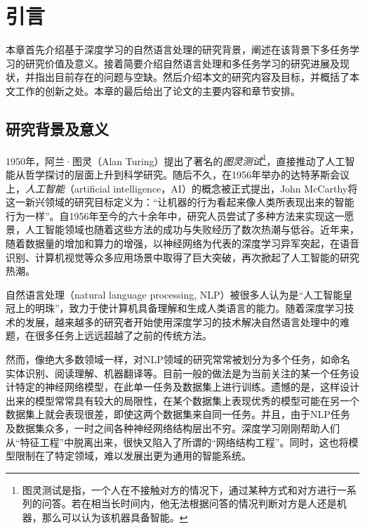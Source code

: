 \chapter{引言}
\label{cha:intro}
本章首先介绍基于深度学习的自然语言处理的研究背景，阐述在该背景下多任务学习的研究价值及意义。接着简要介绍自然语言处理和多任务学习的研究进展及现状，并指出目前存在的问题与空缺。然后介绍本文的研究内容及目标，并概括了本文工作的创新之处。本章的最后给出了论文的主要内容和章节安排。

\section{研究背景及意义}
1950年，阿兰·图灵（Alan Turing）提出了著名的\emph{图灵测试}\footnote{图灵测试是指，一个人在不接触对方的情况下，通过某种方式和对方进行一系列的问答。若在相当长时间内，他无法根据问答的情况判断对方是人还是机器，那么可以认为该机器具备智能。}，直接推动了人工智能从哲学探讨的层面上升到科学研究。随后不久，在1956年举办的达特茅斯会议上，\emph{人工智能}（artificial intelligence，AI）的概念被正式提出，John McCarthy将这一新兴领域的研究目标定义为：“让机器的行为看起来像人类所表现出来的智能行为一样”。自1956年至今的六十余年中，研究人员尝试了多种方法来实现这一愿景，人工智能领域也随着这些方法的成功与失败经历了数次热潮与低谷。近年来，随着数据量的增加和算力的增强，以神经网络为代表的深度学习异军突起，在语音识别\cite{DBLP:conf/asru/MikolovDPBC11}\cite{DBLP:conf/apsipa/LiHYW13}、计算机视觉\cite{DBLP:journals/cacm/KrizhevskySH17}\cite{DBLP:journals/pami/FarabetCNL13}\cite{DBLP:conf/nips/TompsonJLB14}等众多应用场景中取得了巨大突破，再次掀起了人工智能的研究热潮。

自然语言处理（natural language processing, NLP）被很多人认为是“人工智能皇冠上的明珠”，致力于使计算机具备理解和生成人类语言的能力。随着深度学习技术的发展，越来越多的研究者开始使用深度学习的技术解决自然语言处理中的难题\cite{DBLP:journals/jmlr/CollobertWBKKK11}\cite{DBLP:conf/emnlp/BordesCW14}\cite{DBLP:conf/acl/JeanCMB15}\cite{DBLP:conf/nips/SutskeverVL14}，在很多任务上远远超越了之前的传统方法。

然而，像绝大多数领域一样，对NLP领域的研究常常被划分为多个任务，如命名实体识别、阅读理解、机器翻译等。目前一般的做法是为当前关注的某一个任务设计特定的神经网络模型，在此单一任务及数据集上进行训练。遗憾的是，这样设计出来的模型常常具有较大的局限性，在某个数据集上表现优秀的模型可能在另一个数据集上就会表现很差，即使这两个数据集来自同一任务。并且，由于NLP任务及数据集众多，一时之间各种神经网络结构层出不穷。深度学习刚刚帮助人们从“特征工程”中脱离出来，很快又陷入了所谓的“网络结构工程”。同时，这也将模型限制在了特定领域，难以发展出更为通用的智能系统。

